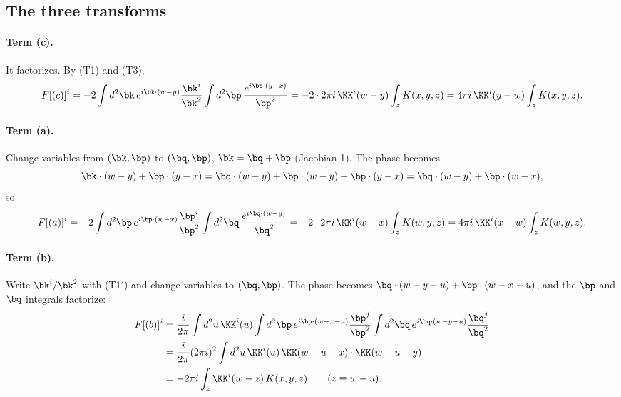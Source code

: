 \subsection{The three transforms}\label{sec:ft-three}
\paragraph{Term (c).} It factorizes. By (T1) and (T3),
\begin{equation}
F[(c)]^i=-2\int d^2\bk\,e^{i\bk\cdot(w-y)}\frac{\bk^i}{\bk^2}\int d^2\bp\,\frac{e^{i\bp\cdot(y-x)}}{\bp^2}=-2\cdot2\pi i\,\KK^i(w-y)\int_zK(x,y,z)=4\pi i\,\KK^i(y-w)\int_zK(x,y,z).
\end{equation}
\paragraph{Term (a).} Change variables from $(\bk,\bp)$ to $(\bq,\bp)$, $\bk=\bq+\bp$ (Jacobian 1). The phase becomes
\begin{equation}
\bk\cdot(w-y)+\bp\cdot(y-x)=\bq\cdot(w-y)+\bp\cdot(w-y)+\bp\cdot(y-x)=\bq\cdot(w-y)+\bp\cdot(w-x),
\end{equation}
so
\begin{equation}
F[(a)]^i=-2\int d^2\bp\,e^{i\bp\cdot(w-x)}\frac{\bp^i}{\bp^2}\int d^2\bq\,\frac{e^{i\bq\cdot(w-y)}}{\bq^2}=-2\cdot2\pi i\,\KK^i(w-x)\int_zK(w,y,z)=4\pi i\,\KK^i(x-w)\int_zK(w,y,z).
\end{equation}
\paragraph{Term (b).} Write $\bk^i/\bk^2$ with (T1$'$) and change variables to $(\bq,\bp)$. The phase becomes $\bq\cdot(w-y-u)+\bp\cdot(w-x-u)$, and the $\bp$ and $\bq$ integrals factorize:
\begin{align}
F[(b)]^i&=\frac{i}{2\pi}\int d^2u\,\KK^i(u)\int d^2\bp\,e^{i\bp\cdot(w-x-u)}\frac{\bp^j}{\bp^2}\int d^2\bq\,e^{i\bq\cdot(w-y-u)}\frac{\bq^j}{\bq^2}\notag\\
&=\frac{i}{2\pi}(2\pi i)^2\int d^2u\,\KK^i(u)\,\KK(w-u-x)\cdot\KK(w-u-y)\notag\\
&=-2\pi i\int_z\KK^i(w-z)\,K(x,y,z)\qquad(z\equiv w-u).
\end{align}

